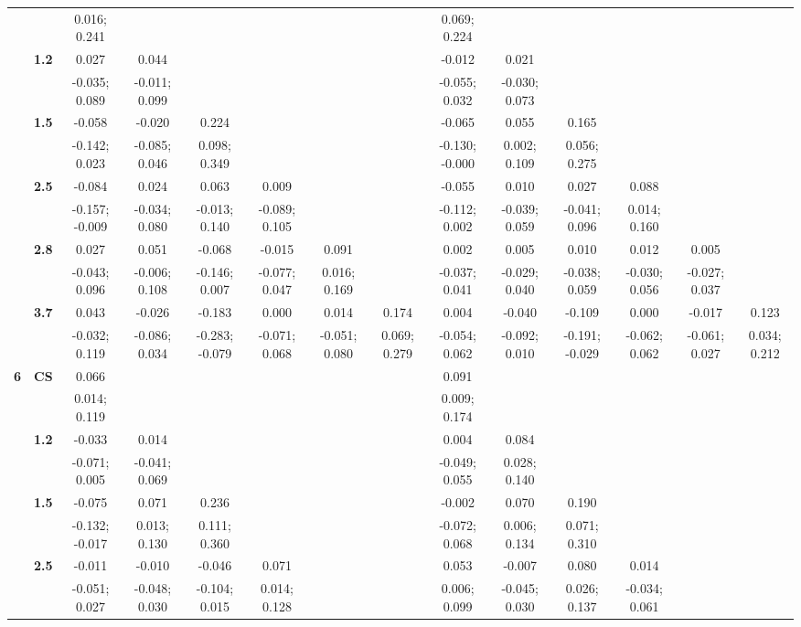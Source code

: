 \begin{landscape}
\begin{table}[!htp]
\begin{center}
\begin{tabular}{>{\bfseries}c>{\bfseries}ccccccccccccc}
 &  & 0.016; 0.241 &  &  &  &  &  & 0.069; 0.224 &  &  &  &  & \\[0.7ex]
 & 1.2 & 0.027 & 0.044 &  &  &  &  & -0.012 & 0.021 &  &  &  & \\
 &  & -0.035; 0.089 & -0.011; 0.099 &  &  &  &  & -0.055; 0.032 & -0.030; 0.073 &  &  &  & \\[0.7ex]
 & 1.5 & -0.058 & -0.020 & 0.224 &  &  &  & -0.065 & 0.055 & 0.165 &  &  & \\
 &  & -0.142; 0.023 & -0.085; 0.046 & 0.098; 0.349 &  &  &  & -0.130; -0.000 & 0.002; 0.109 & 0.056; 0.275 &  &  & \\[0.7ex]
 & 2.5 & -0.084 & 0.024 & 0.063 & 0.009 &  &  & -0.055 & 0.010 & 0.027 & 0.088 &  & \\
 &  & -0.157; -0.009 & -0.034; 0.080 & -0.013; 0.140 & -0.089; 0.105 &  &  & -0.112; 0.002 & -0.039; 0.059 & -0.041; 0.096 & 0.014; 0.160 &  & \\[0.7ex]
 & 2.8 & 0.027 & 0.051 & -0.068 & -0.015 & 0.091 &  & 0.002 & 0.005 & 0.010 & 0.012 & 0.005 & \\
 &  & -0.043; 0.096 & -0.006; 0.108 & -0.146; 0.007 & -0.077; 0.047 & 0.016; 0.169 &  & -0.037; 0.041 & -0.029; 0.040 & -0.038; 0.059 & -0.030; 0.056 & -0.027; 0.037 & \\[0.7ex]
 & 3.7 & 0.043 & -0.026 & -0.183 & 0.000 & 0.014 & 0.174 & 0.004 & -0.040 & -0.109 & 0.000 & -0.017 & 0.123\\
 &  & -0.032; 0.119 & -0.086; 0.034 & -0.283; -0.079 & -0.071; 0.068 & -0.051; 0.080 & 0.069; 0.279 & -0.054; 0.062 & -0.092; 0.010 & -0.191; -0.029 & -0.062; 0.062 & -0.061; 0.027 & 0.034; 0.212\\[0.7ex]
 \midrule
6 & CS & 0.066 &  &  &  &  &  & 0.091 &  &  &  &  & \\
 &  & 0.014; 0.119 &  &  &  &  &  & 0.009; 0.174 &  &  &  &  & \\[0.7ex]
 & 1.2 & -0.033 & 0.014 &  &  &  &  & 0.004 & 0.084 &  &  &  & \\
 &  & -0.071; 0.005 & -0.041; 0.069 &  &  &  &  & -0.049; 0.055 & 0.028; 0.140 &  &  &  & \\[0.7ex]
 & 1.5 & -0.075 & 0.071 & 0.236 &  &  &  & -0.002 & 0.070 & 0.190 &  &  & \\
 &  & -0.132; -0.017 & 0.013; 0.130 & 0.111; 0.360 &  &  &  & -0.072; 0.068 & 0.006; 0.134 & 0.071; 0.310 &  &  & \\[0.7ex]
 & 2.5 & -0.011 & -0.010 & -0.046 & 0.071 &  &  & 0.053 & -0.007 & 0.080 & 0.014 &  & \\
 &  & -0.051; 0.027 & -0.048; 0.030 & -0.104; 0.015 & 0.014; 0.128 &  &  & 0.006; 0.099 & -0.045; 0.030 & 0.026; 0.137 & -0.034; 0.061 &  & \\[0.7ex]

\end{tabular}
\end{center}
\end{table}
\end{landscape}
